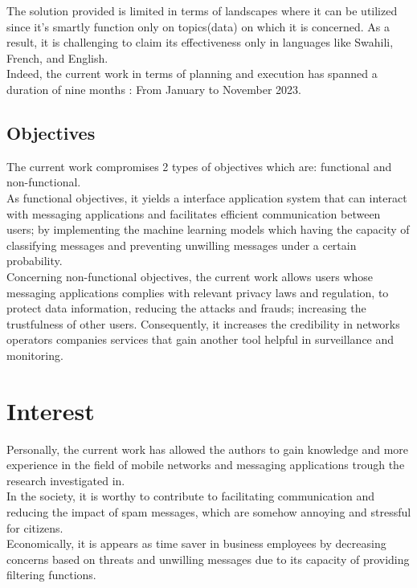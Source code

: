 \documentclass[12pt,a4paper, oneside]{book}
\begin{document}
	The solution provided is limited in terms of landscapes where it can be utilized since it's smartly function only on topics(data) on which it is concerned. As a result, it is challenging to claim its effectiveness only in languages like Swahili, French, and English. \\
		
	Indeed, the current work in terms of planning and execution has spanned a duration of nine months : From January to November 2023. 
	\subsection{Objectives}
	The current work compromises 2 types of objectives which are: functional and non-functional.\\
		
	As functional objectives, it yields a interface application system that can interact with messaging applications and facilitates efficient communication between users; by implementing the machine learning models which having the capacity of classifying messages and preventing unwilling messages under a certain probability.\\
				
	Concerning non-functional objectives, the current work allows users whose messaging applications complies with relevant privacy laws and regulation, to protect data information, reducing the attacks and frauds; increasing the trustfulness of other users. Consequently, it increases the credibility in networks operators companies services that gain another tool helpful in surveillance and monitoring. 
	
	\section{Interest} 
	Personally, the current work has allowed the authors to gain knowledge and more experience in the field of mobile networks and messaging applications trough the research investigated in. \\
	
	In the society, it is worthy to contribute to facilitating communication and reducing the impact  of spam messages, which are somehow annoying and stressful for citizens.\\
		
	Economically, it is appears as time saver in business employees by decreasing concerns based on threats and unwilling messages due to its capacity of providing filtering functions.
			
\end{document}
